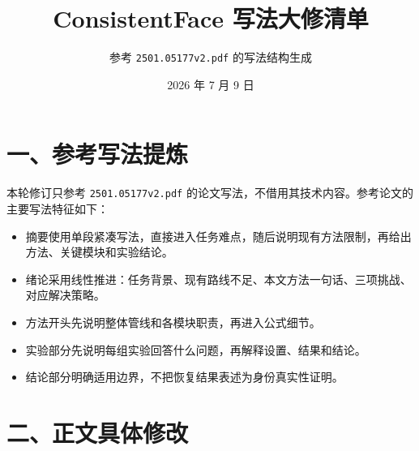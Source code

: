 \documentclass[UTF8,a4paper,zihao=-4]{ctexart}
\title{\textbf{ConsistentFace 写法大修清单}}
\author{参考 \texttt{2501.05177v2.pdf} 的写法结构生成}
\date{2026 年 7 月 9 日}
\begin{document}
\maketitle

\section*{一、参考写法提炼}

本轮修订只参考 \texttt{2501.05177v2.pdf} 的论文写法，不借用其技术内容。参考论文的主要写法特征如下：
\begin{itemize}
  \item 摘要使用单段紧凑写法，直接进入任务难点，随后说明现有方法限制，再给出方法、关键模块和实验结论。
  \item 绪论采用线性推进：任务背景、现有路线不足、本文方法一句话、三项挑战、对应解决策略。
  \item 方法开头先说明整体管线和各模块职责，再进入公式细节。
  \item 实验部分先说明每组实验回答什么问题，再解释设置、结果和结论。
  \item 结论部分明确适用边界，不把恢复结果表述为身份真实性证明。
\end{itemize}

\section*{二、正文具体修改}
\end{document}
